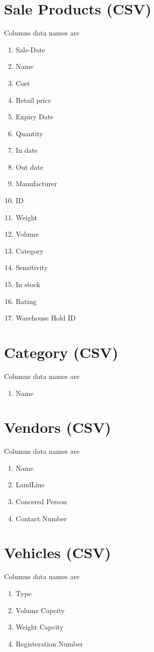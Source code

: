 \documentclass[12pt,a4paper]{article}
\begin{document}
\section*{Sale Products (CSV)}
Columns data names are
\begin{enumerate}
\item Sale-Date    
\item Name
\item Cost
\item Retail price
\item Expiry Date
\item Quantity
\item In date 
\item Out date
\item Manufacturer 
\item ID
\item Weight
\item Volume
\item Category
\item Sensitivity
\item In stock
\item Rating
\item Warehouse Hold ID
\end{enumerate}

\section*{Category (CSV)}
Columns data names are
\begin{enumerate} 
\item Name
\end{enumerate}

\section*{Vendors (CSV)}
Columns data names are
\begin{enumerate}
\item Name
\item LandLine
\item Concered Person 
\item Contact Number
\end{enumerate}

\section*{Vehicles (CSV)}
Columns data names are
\begin{enumerate}
\item Type
\item Volume Capcity
\item Weight Capcity 
\item Registeration Number
\end{enumerate}
\end{document}
